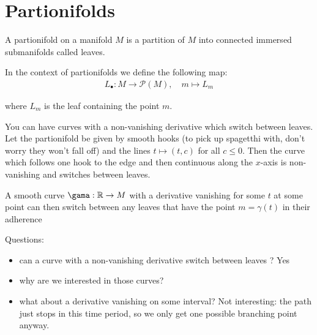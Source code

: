 




	\section{Partionifolds}
		A partionifold on a manifold $M$ is a partition of $M$ into connected immersed submanifolds called leaves. \bigskip

		In the context of partionifolds we define the following map:
%
		\begin{align*}
			L_\bullet : M \to \mathcal{P}(M), \quad m \mapsto L_m
		\end{align*}

		where $L_m$ is the leaf containing the point $m$. \bigskip

		You can have curves with a non-vanishing derivative which switch between leaves. Let the partionifold be given by smooth hooks (to pick up spagetthi with, don't worry they won't fall off) and the lines $t \mapsto (t, c)$ for all $c \leq 0$. Then the curve which follows one hook to the edge and then continuous along the $x$-axis is non-vanishing and switches between leaves.


	A smooth curve $\gama: \R \to M$ with a derivative vanishing for some $t$ at some point can then switch between any leaves that have the point $m = \gamma(t)$ in their adherence

	Questions:
	\begin{itemize}
		\item can a curve with a non-vanishing derivative switch between leaves ? Yes
		\item why are we interested in those curves?
		\item what about a derivative vanishing on some interval? Not interesting: the path just stops in this time period, so we only get one possible branching point anyway.
	\end{itemize}


